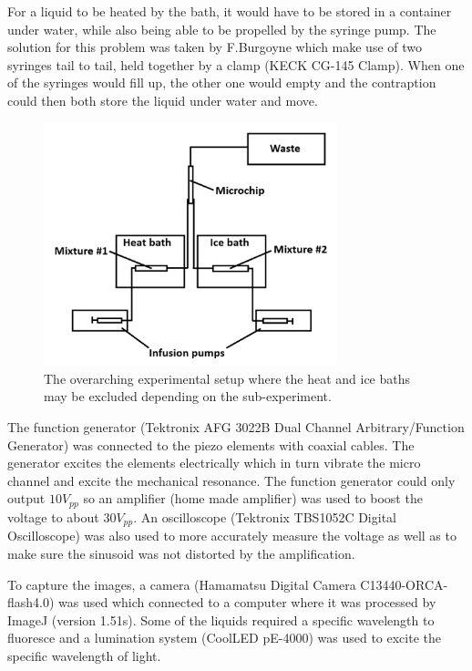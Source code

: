 \documentclass[twoside,twocolumn,9pt,a4paper]{IEEEtran}
\begin{document}
For a liquid to be heated by the bath, it would have to be stored in a container under water, while also being able to be propelled by the syringe pump. The solution for this problem was taken by F.Burgoyne \cite{Burgoyne} which make use of two syringes tail to tail, held together by a clamp (KECK CG-145 Clamp). When one of the syringes would fill up, the other one would empty and the contraption could then both store the liquid under water and move.

\begin{figure}[h]
\begin{center}
\includegraphics[width=8.5cm]{Images/ExperimentSetUp.png} %
\caption{The overarching experimental setup where the heat and ice baths may be excluded depending on the sub-experiment.}
\label{Setup}
\end{center}
\end{figure} %

The function generator (Tektronix AFG 3022B Dual Channel Arbitrary/Function Generator) was connected to the piezo elements with coaxial cables. The generator excites the elements electrically which in turn vibrate the micro channel and excite the mechanical resonance. The function generator could only output $10 V_{pp}$ so an amplifier (home made amplifier) was used to boost the voltage to about $30 V_{pp}$. An oscilloscope (Tektronix TBS1052C Digital Oscilloscope) was also used to more accurately measure the voltage as well as to make sure the sinusoid was not distorted by the amplification.

To capture the images, a camera (Hamamatsu Digital Camera C13440-ORCA-flash4.0) was used which connected to a computer where it was processed by ImageJ (version 1.51s). Some of the liquids required a specific wavelength to fluoresce and a lumination system (CoolLED pE-4000) was used to excite the specific wavelength of light. 
\end{document}
